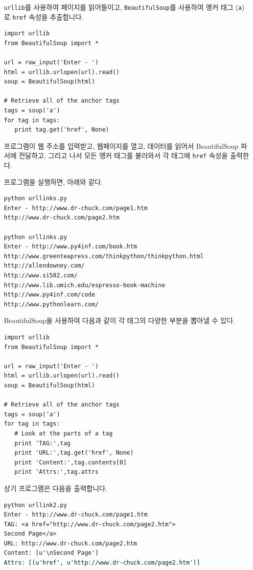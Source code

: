 {\tt urllib}를 사용하여 페이지를 읽어들이고, {\tt BeautifulSoup}를 사용하여 앵커 태그 ({\tt a})로 {\tt href} 속성을  추출합니다.


\beforeverb
\begin{verbatim}
import urllib
from BeautifulSoup import *

url = raw_input('Enter - ')
html = urllib.urlopen(url).read()
soup = BeautifulSoup(html)

# Retrieve all of the anchor tags
tags = soup('a')
for tag in tags:
   print tag.get('href', None)
\end{verbatim}
\afterverb
%

프로그램이 웹 주소를 입력받고, 웹페이지를 열고, 데이터를 읽어서 BeautifulSoup 파서에 전달하고,
그리고 나서 모든 앵커 태그를 불러와서 각 태그에 {\tt href} 속성을 출력한다.

프로그램을 실행하면, 아래와 같다.

\beforeverb
\begin{verbatim}
python urllinks.py 
Enter - http://www.dr-chuck.com/page1.htm
http://www.dr-chuck.com/page2.htm

python urllinks.py 
Enter - http://www.py4inf.com/book.htm
http://www.greenteapress.com/thinkpython/thinkpython.html
http://allendowney.com/
http://www.si502.com/
http://www.lib.umich.edu/espresso-book-machine
http://www.py4inf.com/code
http://www.pythonlearn.com/
\end{verbatim}
\afterverb
%

BeautifulSoup을 사용하여 다음과 같이 각 태그의 다양한 부분을 뽑아낼 수 있다.

\beforeverb
\begin{verbatim}
import urllib
from BeautifulSoup import *

url = raw_input('Enter - ')
html = urllib.urlopen(url).read()
soup = BeautifulSoup(html)

# Retrieve all of the anchor tags
tags = soup('a')
for tag in tags:
   # Look at the parts of a tag
   print 'TAG:',tag
   print 'URL:',tag.get('href', None)
   print 'Content:',tag.contents[0]
   print 'Attrs:',tag.attrs
\end{verbatim}
\afterverb
%

상기 프로그램은 다음을 출력합니다.

\beforeverb
\begin{verbatim}
python urllink2.py 
Enter - http://www.dr-chuck.com/page1.htm
TAG: <a href="http://www.dr-chuck.com/page2.htm">
Second Page</a>
URL: http://www.dr-chuck.com/page2.htm
Content: [u'\nSecond Page']
Attrs: [(u'href', u'http://www.dr-chuck.com/page2.htm')]
\end{verbatim}
\afterverb
%

